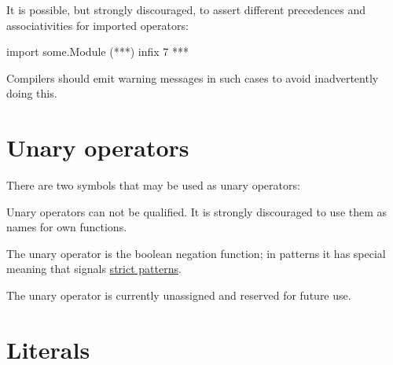 \begin{flushleft}
   \oder{}   
\end{flushleft}

It is possible, but strongly discouraged, to assert different precedences and associativities for imported operators:

\begin{code}
import some.Module (***)
infix 7 ***
\end{code}

Compilers should emit warning messages in such cases to avoid inadvertently doing this.


\section{Unary operators}

There are two symbols that may be used as unary operators:

\begin{flushleft}
 \sym{!} \oder{} 
\end{flushleft}

Unary operators can not be qualified. It is strongly discouraged to use them as names for own functions.

The unary operator \sym{!} is the boolean negation function; in patterns it has special meaning that signals  \hyperref[strictpats]{strict patterns}.

The unary operator  is currently unassigned and reserved for future use. 

\section{Literals}

